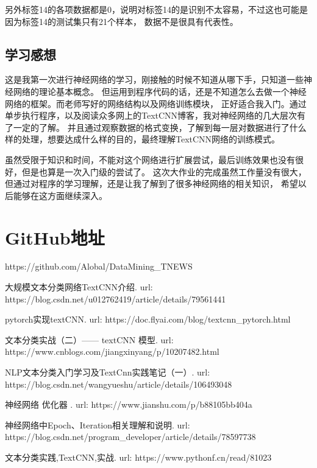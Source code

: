 \documentclass[11pt]{article}
\begin{document}
\begin{CJK*}{UTF8}{gbsn}
另外标签14的各项数据都是0，说明对标签14的是识别不太容易，不过这也可能是因为标签14的测试集只有21个样本，
数据不是很具有代表性。
\subsection{学习感想}
这是我第一次进行神经网络的学习，刚接触的时候不知道从哪下手，只知道一些神经网络的理论基本概念。
但运用到程序代码的话，还是不知道怎么去做一个神经网络的框架。而老师写好的网络结构以及网络训练模块，
正好适合我入门。通过单步执行程序，以及阅读众多网上的TextCNN博客，我对神经网络的几大层次有了一定的了解。
并且通过观察数据的格式变换，了解到每一层对数据进行了什么样的处理，想要达成什么样的目的，最终理解TextCNN网络的训练模式。

虽然受限于知识和时间，不能对这个网络进行扩展尝试，最后训练效果也没有很好，但是也算是一次入门级的尝试了。
这次大作业的完成虽然工作量没有很大，但通过对程序的学习理解，还是让我了解到了很多神经网络的相关知识，
希望以后能够在这方面继续深入。

\section*{GitHub地址}
https://github.com/Alobal/DataMining\_TNEWS


%
%

\begin{thebibliography}{}

\bibitem[\protect\citename{}]{}
大规模文本分类网络TextCNN介绍.
\newblock url: 
\newblock https://blog.csdn.net/u012762419/article/details/79561441
\newblock 

\bibitem[\protect\citename{}]{}
pytorch实现textCNN. 
\newblock url: 
\newblock https://doc.flyai.com/blog/textcnn\_pytorch.html
\newblock 

\bibitem[\protect\citename{}]{}
文本分类实战（二）—— textCNN 模型. 
\newblock url:  
\newblock https://www.cnblogs.com/jiangxinyang/p/10207482.html
\newblock 

\bibitem[\protect\citename{}]{}
NLP文本分类入门学习及TextCnn实践笔记（一）. 
\newblock url:  
\newblock https://blog.csdn.net/wangyueshu/article/details/106493048
\newblock 

\bibitem[\protect\citename{}]{}
神经网络 优化器 . 
\newblock url:  
\newblock https://www.jianshu.com/p/b88105bb404a
\newblock 

\bibitem[\protect\citename{}]{}
神经网络中Epoch、Iteration相关理解和说明. 
\newblock url:  
\newblock https://blog.csdn.net/program\_developer/article/details/78597738
\newblock 

\bibitem[\protect\citename{}]{}
文本分类实践,TextCNN,实战.
\newblock url:  
\newblock https://www.pythonf.cn/read/81023
\newblock 

\end{thebibliography}

\end{CJK*}
\end{document}
